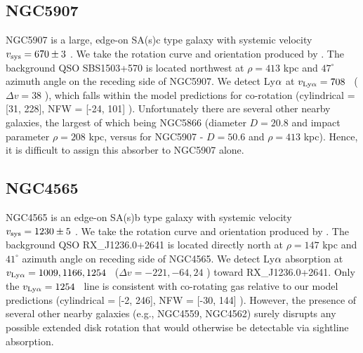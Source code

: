 


\subsection{NGC5907}
NGC5907 is a large, edge-on SA(s)c type galaxy with systemic velocity $v_{\rm sys} = 670 \pm 3$ \kms. We take the rotation curve and orientation produced by \cite{yim2014}. The background QSO SBS1503+570 is located northwest at $\rho = 413$ kpc and $47^{\circ}$ azimuth angle on the receding side of NGC5907. We detect Ly$\rm \alpha$ at $v_{\rm Ly\alpha} = 708$ \kms~($\Delta v = 38$ \kms), which falls within the model predictions for co-rotation (cylindrical = [31, 228], NFW = [-24, 101] \kms). Unfortunately there are several other nearby galaxies, the largest of which being NGC5866 (diameter $D = 20.8$ and impact parameter $\rho = 208$ kpc, versus for NGC5907 - $D = 50.6$ and $\rho = 413$ kpc). Hence, it is difficult to assign this absorber to NGC5907 alone.



%
 



\subsection{NGC4565}
NGC4565 is an edge-on SA(s)b type galaxy with systemic velocity $v_{\rm sys} = 1230 \pm 5$ \kms. We take the rotation curve and orientation produced by \cite{sofue1996}. The background QSO RX\_J1236.0+2641 is located directly north at $\rho = 147$ kpc and $41^{\circ}$ azimuth angle on receding side of NGC4565. We detect Ly$\rm \alpha$ absorption at $v_{\rm Ly\alpha} = 1009, 1166, 1254$ \kms~($\Delta v = -221, -64, 24$ \kms) toward RX\_J1236.0+2641. Only the $v_{\rm Ly\alpha}=1254$ \kms~line is consistent with co-rotating gas relative to our model predictions (cylindrical = [-2, 246], NFW = [-30, 144] \kms). However, the presence of several other nearby galaxies (e.g., NGC4559, NGC4562) surely disrupts any possible extended disk rotation that would otherwise be detectable via sightline absorption.

